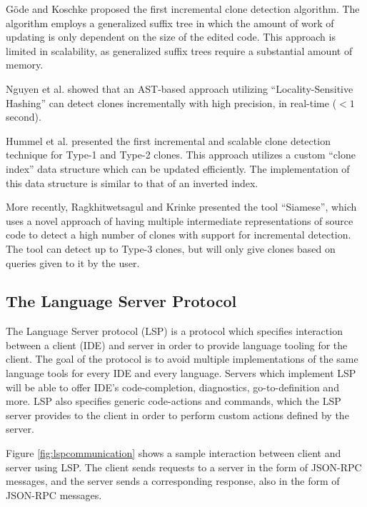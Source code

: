 \documentclass[12pt]{article}
\begin{document}
Göde and Koschke\cite{GodeIncrementalCloneDetection} proposed the first incremental clone
detection algorithm. The algorithm employs a generalized suffix tree in which the amount
of work of updating is only dependent on the size of the edited code. This approach is
limited in scalability, as generalized suffix trees require a substantial amount of
memory.

Nguyen et al. showed that an AST-based approach utilizing ``Locality-Sensitive Hashing''
can detect clones incrementally with high precision, in real-time ($< 1$ second).

Hummel et al.\cite{IndexBasedIncrementalCloneDetection} presented the first incremental
and scalable clone detection technique for Type-1 and Type-2 clones. This approach
utilizes a custom ``clone index'' data structure which can be updated efficiently. The
implementation of this data structure is similar to that of an inverted index.

More recently, Ragkhitwetsagul and Krinke\cite{SiameseScalableAndIncrementalClone}
presented the tool ``Siamese'', which uses a novel approach of having multiple
intermediate representations of source code to detect a high number of clones with
support for incremental detection. The tool can detect up to Type-3 clones, but will only
give clones based on queries given to it by the user. 

\subsection{The Language Server Protocol}

The Language Server protocol (LSP) is a protocol which specifies interaction between a
client (IDE) and server in order to provide language tooling for the client. The goal of
the protocol is to avoid multiple implementations of the same language tools for every
IDE and every language. Servers which implement LSP will be able to offer IDE's
code-completion, diagnostics, go-to-definition and more. LSP also specifies generic
code-actions and commands, which the LSP server provides to the client in order to perform
custom actions defined by the server.

Figure \ref{fig:lspcommunication} shows a sample interaction between client and server
using LSP. The client sends requests to a server in the form of JSON-RPC messages, and the
server sends a corresponding response, also in the form of JSON-RPC messages.
\end{document}
